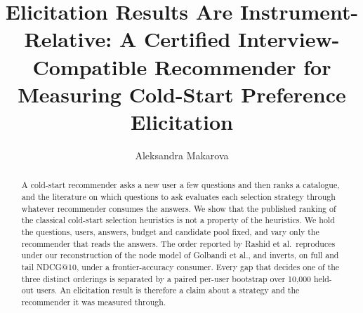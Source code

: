 \documentclass[manuscript,screen,review]{acmart}
\begin{document}
\title[Elicitation Results Are Instrument-Relative]{Elicitation Results Are Instrument-Relative: A Certified Interview-Compatible Recommender for Measuring Cold-Start Preference Elicitation}

\author{Aleksandra Makarova}

\renewcommand{\shortauthors}{Makarova}

\begin{abstract}
A cold-start recommender asks a new user a few questions and then ranks a catalogue, and the literature on which questions to ask evaluates each selection strategy through whatever recommender consumes the answers. We show that the published ranking of the classical cold-start selection heuristics is not a property of the heuristics. We hold the questions, users, answers, budget and candidate pool fixed, and vary only the recommender that reads the answers. The order reported by Rashid et al.\ reproduces under our reconstruction of the node model of Golbandi et al., and inverts, on full and tail NDCG@10, under a frontier-accuracy consumer. Every gap that decides one of the three distinct orderings is separated by a paired per-user bootstrap over 10,000 held-out users. An elicitation result is therefore a claim about a strategy and the recommender it was measured through.


\end{abstract}
\end{document}
